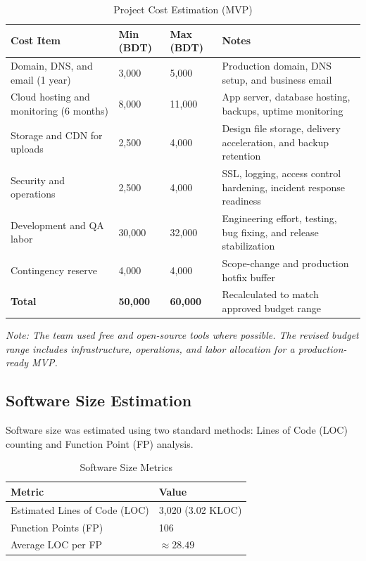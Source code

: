 \documentclass[12pt,a4paper]{report}
\begin{document}
\begin{table}[H]
  \centering
  \caption{Project Cost Estimation (MVP)}
  \begin{tabularx}{\textwidth}{L{5cm} R{2.5cm} R{2.5cm} X}
    \toprule
    \textbf{Cost Item} & \textbf{Min (BDT)} & \textbf{Max (BDT)} & \textbf{Notes} \\
    \midrule
    Domain, DNS, and email (1 year)  & 3,000  & 5,000  & Production domain, DNS setup, and business email \\
    Cloud hosting and monitoring (6 months) & 8,000  & 11,000 & App server, database hosting, backups, uptime monitoring \\
    Storage and CDN for uploads     & 2,500  & 4,000  & Design file storage, delivery acceleration, and backup retention \\
    Security and operations          & 2,500  & 4,000  & SSL, logging, access control hardening, incident response readiness \\
    Development and QA labor         & 30,000 & 32,000 & Engineering effort, testing, bug fixing, and release stabilization \\
    Contingency reserve              & 4,000  & 4,000  & Scope-change and production hotfix buffer \\
    \midrule
    \textbf{Total}                & \textbf{50,000} & \textbf{60,000} & Recalculated to match approved budget range \\
    \bottomrule
  \end{tabularx}
\end{table}

\textit{Note: The team used free and open-source tools where possible. The revised budget range includes infrastructure, operations, and labor allocation for a production-ready MVP.}

\subsection{Software Size Estimation}

Software size was estimated using two standard methods: Lines of Code (LOC) counting and Function Point (FP) analysis.

\begin{table}[H]
  \centering
  \caption{Software Size Metrics}
  \begin{tabular}{ll}
    \toprule
    \textbf{Metric} & \textbf{Value} \\
    \midrule
    Estimated Lines of Code (LOC) & 3,020 (3.02 KLOC) \\
    Function Points (FP)          & 106 \\
    Average LOC per FP            & $\approx 28.49$ \\
    \bottomrule
  \end{tabular}
\end{table}
\end{document}

